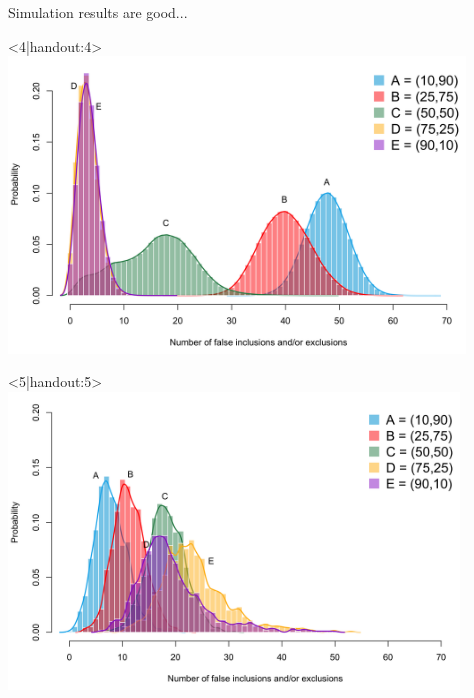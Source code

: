 \documentclass[]{beamer}\usepackage[]{graphicx}\usepackage[]{color}
\begin{document}
\begin{frame}{Simulation results are good...}
\begin{onlyenv}
	\end{onlyenv}
	\begin{onlyenv}<4|handout:4>
		\includegraphics[height=3.1in]{figure/sim3}
	\end{onlyenv}
	\begin{onlyenv}<5|handout:5>
		\includegraphics[height=3.1in]{figure/sim6}
	\end{onlyenv}	
\end{frame}
\end{document}
